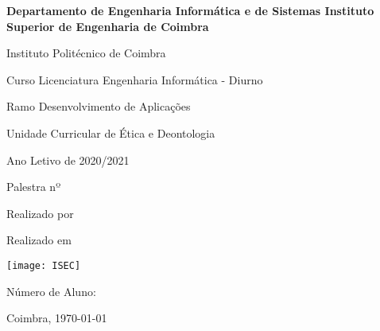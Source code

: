 
\begin{titlepage}
    \begin{flushright}
        \textbf{Departamento de Engenharia Informática e de Sistemas
            Instituto Superior de Engenharia de Coimbra}

        Instituto Politécnico de Coimbra
    \end{flushright}
    \begin{center}
        \vspace{0.5cm}
        \begin{large}
            \newcommand{\spacetitle}{0.0cm}

            Curso Licenciatura Engenharia Informática - Diurno
            \vspace{\spacetitle}

            Ramo Desenvolvimento de Aplicações
            \vspace{\spacetitle}

            Unidade Curricular de Ética e Deontologia
            \vspace{\spacetitle}

            Ano Letivo de 2020/2021
            \vspace{\spacetitle}

            \vfill

            Palestra nº \palestranumero
            \vspace{\spacetitle}

            \palestratitulo
            \vspace{\spacetitle}

            Realizado por \palestraautor

            Realizado em \palestradata

            \vfill

            \texttt{[image: ISEC]}
            \vfill

            \myauthor

            Número de Aluno: \mynumerodealuno

            Coimbra, \today
            \vspace{\spacetitle}

            \myauthor

        \end{large}
    \end{center}
\end{titlepage}